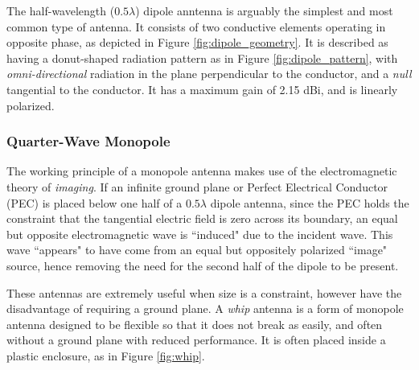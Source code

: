 The half-wavelength ($0.5 \lambda$) dipole anntenna is arguably the simplest and most common type of antenna. It consists of two conductive elements operating in opposite phase, as depicted in Figure \ref{fig:dipole_geometry}. It is described as having a donut-shaped radiation pattern as in Figure \ref{fig:dipole_pattern}, with \textit{omni-directional} radiation in the plane perpendicular to the conductor, and a \textit{null} tangential to the conductor. It has a maximum gain of 2.15 dBi, and is linearly polarized. \cite{site-antennaTheory}

\subsubsection{Quarter-Wave Monopole}\label{monopole}
The working principle of a monopole antenna makes use of the electromagnetic theory of \textit{imaging}. If an infinite ground plane or Perfect Electrical Conductor (PEC) is placed below one half of a $0.5 \lambda$ dipole antenna, since the PEC holds the constraint that the tangential electric field is zero across its boundary, an equal but opposite electromagnetic wave is ``induced" due to the incident wave. This wave ``appears" to have come from an equal but oppositely polarized ``image" source, hence removing the need for the second half of the dipole to be present.

These antennas are extremely useful when size is a constraint, however have the disadvantage of requiring a ground plane. A \textit{whip} antenna is a form of monopole antenna designed to be flexible so that it does not break as easily, and often without a ground plane with reduced performance. It is often placed inside a plastic enclosure, as in Figure \ref{fig:whip}. \cite{site-antennaTheory}


